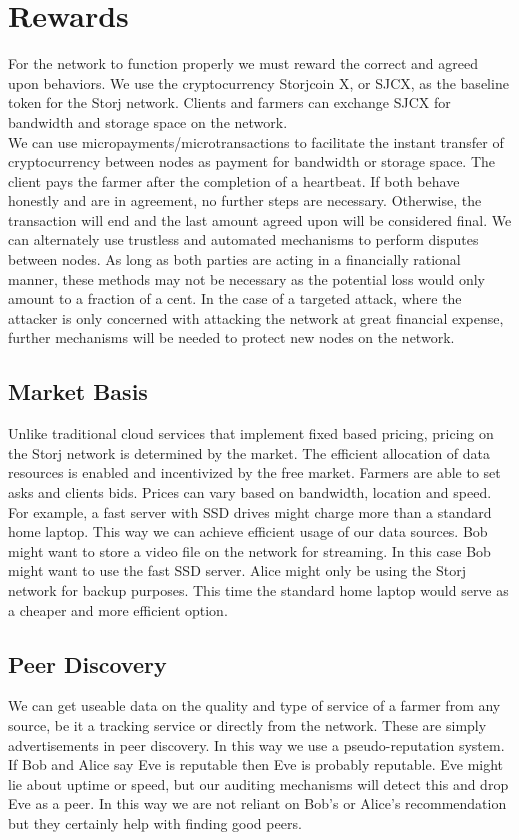 \documentclass[a4paper,10pt]{article}
\begin{document}
\section{Rewards}
For the network to function properly we must reward the correct and agreed upon behaviors. We use the cryptocurrency Storjcoin X, or SJCX, as the baseline token for the Storj network. Clients and farmers can exchange SJCX for bandwidth and storage space on the network. \\

We can use micropayments/microtransactions \cite{12} \cite{13} to facilitate the instant transfer of cryptocurrency between nodes as payment for bandwidth or storage space. The client pays the farmer after the completion of a heartbeat. If both behave honestly and are in agreement, no further steps are necessary. Otherwise, the transaction will end and the last amount agreed upon will be considered final. We can alternately use trustless and automated mechanisms to perform disputes between nodes. As long as both parties are acting in a financially rational manner, these methods may not be necessary as the potential loss would only amount to a fraction of a cent. In the case of a targeted attack, where the attacker is only concerned with attacking the network at great financial expense, further mechanisms will be needed to protect new nodes on the network. \\

\subsection{Market Basis}
Unlike traditional cloud services that implement fixed based pricing, pricing on the Storj network is determined by the market. The efficient allocation of data resources is enabled and incentivized by the free market. Farmers are able to set asks and clients bids. Prices can vary based on bandwidth, location and speed. For example, a fast server with SSD drives might charge more than a standard home laptop. This way we can achieve efficient usage of our data sources. Bob might want to store a video file on the network for streaming. In this case Bob might want to use the fast SSD server. Alice might only be using the Storj network for backup purposes. This time the standard home laptop would serve as a cheaper and more efficient option.

\subsection{Peer Discovery}
We can get useable data on the quality and type of service of a farmer from any source, be it a tracking service or directly from the network. These are simply advertisements in peer discovery. In this way we use a pseudo-reputation system. If Bob and Alice say Eve is reputable then Eve is probably reputable. Eve might lie about uptime or speed, but our auditing mechanisms will detect this and drop Eve as a peer. In this way we are not reliant on Bob’s or Alice’s recommendation but they certainly help with finding good peers.
\end{document}
